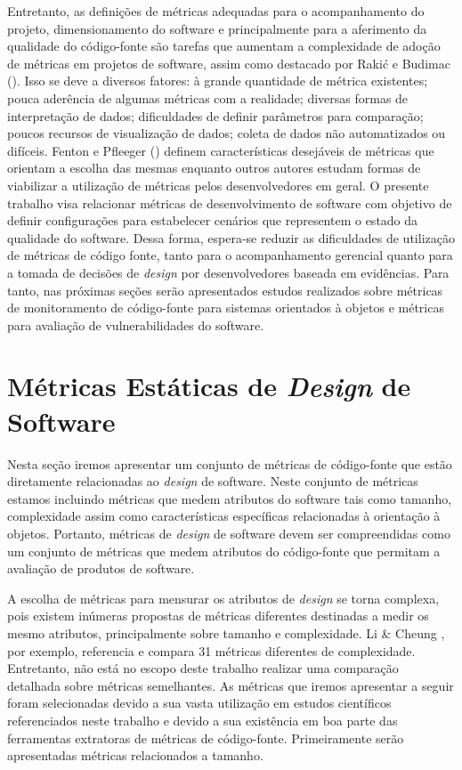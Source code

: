 Entretanto, as definições de métricas adequadas para o acompanhamento do projeto, dimensionamento do software e principalmente para a aferimento da qualidade do código-fonte são tarefas que aumentam a complexidade de adoção de métricas em projetos de software, assim como destacado por Rakić e Budimac (\citeyear{rakic2011budimac}).
%
Isso se deve a diversos fatores: à grande quantidade de métrica existentes; pouca aderência de algumas métricas com a realidade; diversas formas de interpretação de dados; dificuldades de definir parâmetros para comparação; poucos recursos de visualização de dados; coleta de dados não automatizados ou difíceis.
%
Fenton e Pfleeger (\citeyear{fenton1998}) definem características desejáveis de métricas que orientam a escolha das mesmas enquanto outros autores estudam formas de viabilizar a utilização de métricas pelos desenvolvedores em geral\cite{meirelles2013metrics,almeida2010}.
%
O presente trabalho visa relacionar métricas de desenvolvimento de software com objetivo de definir configurações para estabelecer cenários que representem o estado da qualidade do software. Dessa forma, espera-se reduzir as dificuldades de utilização de métricas de código fonte, tanto para o acompanhamento gerencial quanto para a tomada de decisões de \emph{design} por desenvolvedores baseada em evidências. Para tanto, nas próximas seções serão apresentados estudos realizados sobre métricas de monitoramento de código-fonte para sistemas orientados à objetos e métricas para avaliação de vulnerabilidades do software.

%

\section{Métricas Estáticas de \emph{Design} de Software}

Nesta seção iremos apresentar um conjunto de métricas de código-fonte que estão diretamente relacionadas ao \emph{design} de software. Neste conjunto de métricas estamos incluindo métricas que medem atributos do software tais como tamanho, complexidade assim como características específicas relacionadas à orientação à objetos. Portanto, métricas de \emph{design} de software devem ser compreendidas como um conjunto de métricas que medem atributos do código-fonte que permitam a avaliação de produtos de software.

%

A escolha de métricas para mensurar os atributos de \emph{design} se torna complexa, pois existem inúmeras propostas de métricas diferentes destinadas a medir os mesmo atributos, principalmente sobre tamanho e complexidade. Li \& Cheung \citeyear{li1987}, por exemplo, referencia e compara 31 métricas diferentes de complexidade. Entretanto, não está no escopo deste trabalho realizar uma comparação detalhada sobre métricas semelhantes. As métricas que iremos apresentar a seguir foram selecionadas devido a sua vasta utilização em estudos científicos referenciados neste trabalho e devido a sua existência em boa parte das ferramentas extratoras de métricas de código-fonte. Primeiramente serão apresentadas métricas relacionados a tamanho.


